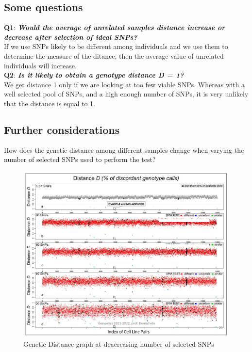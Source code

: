 \subsection{Some questions}

\noindent\textbf{Q1}: \textbf{\textit{Would the average of unrelated samples
distance increase or decrease after selection of ideal SNPs?}}\\

If we use SNPs likely to be different among individuals and we use them to
determine the measure of the ditance, then the average value of unrelated
individuals will increase.\\

\noindent\textbf{Q2}: \textbf{\textit{Is it likely to obtain a genotype distance
D = 1?}}\\

We get distance 1 only if we are looking at too few viable SNPs. Whereas with a
well selected pool of SNPs, and a high enough number of SNPs, it is very
unlikely that the distance is equal to 1.

\subsection{Further considerations}
How does the genetic distance among different samples change when varying the
number of selected SNPs used to perform the test?

\begin{figure}[h]
	\centering
	\includegraphics[width=1\textwidth]{Selected_SNP.PNG}
	\caption{Genetic Distance graph at deacreasing number of selected SNPs}
	\label{fig:sel_snp}
\end{figure}

